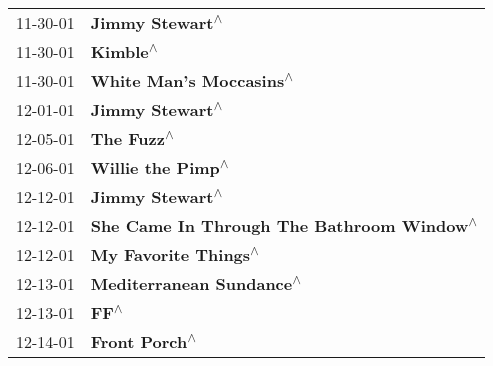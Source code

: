 \begin{supertabular}{p{0.25\columnwidth}p{0.75\columnwidth}}
 11-30-01 &                            \textbf{Jimmy Stewart\textsuperscript{$\wedge$}} \\
 11-30-01 &                                   \textbf{Kimble\textsuperscript{$\wedge$}} \\
 11-30-01 &                    \textbf{White Man's Moccasins\textsuperscript{$\wedge$}} \\
 12-01-01 &                            \textbf{Jimmy Stewart\textsuperscript{$\wedge$}} \\
 12-05-01 &                                 \textbf{The Fuzz\textsuperscript{$\wedge$}} \\
 12-06-01 &                          \textbf{Willie the Pimp\textsuperscript{$\wedge$}} \\
 12-12-01 &                            \textbf{Jimmy Stewart\textsuperscript{$\wedge$}} \\
 12-12-01 &  \textbf{She Came In Through The Bathroom Window\textsuperscript{$\wedge$}} \\
 12-12-01 &                       \textbf{My Favorite Things\textsuperscript{$\wedge$}} \\
 12-13-01 &                   \textbf{Mediterranean Sundance\textsuperscript{$\wedge$}} \\
 12-13-01 &                                       \textbf{FF\textsuperscript{$\wedge$}} \\
 12-14-01 &                              \textbf{Front Porch\textsuperscript{$\wedge$}} \\
\end{supertabular}
